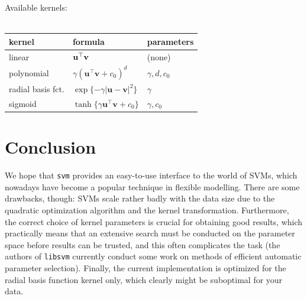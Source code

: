 \documentclass[a4paper]{article}
\begin{document}
\noindent Available kernels:\\
\\
\noindent
\begin{table}[h]
  \centering
  \begin{tabular}{|l|l|l|} \hline
    kernel            & formula & parameters \\ \hline \hline
    linear            & $\bf u^\top v$& (none) \\
    polynomial        & $\gamma (\mathbf{u^\top v}+c_0)^d$ & $\gamma, d, c_0$\\
    radial basis fct. & $\exp\{-\gamma|\mathbf{u-v}|^2\}$&$\gamma$\\
    sigmoid           & $\tanh\{\gamma \mathbf{u^\top v}+c_0\}$ &$\gamma, c_0$\\ \hline
  \end{tabular}
\end{table}

\section*{Conclusion}

We hope that \texttt{svm} provides an easy-to-use interface to the
world of SVMs, which nowadays have become a popular technique in
flexible modelling. There are some drawbacks, though:
SVMs scale rather badly with the data size due to the quadratic
optimization algorithm and the kernel transformation. Furthermore,
the correct choice of kernel parameters is crucial for obtaining good
results, which practically means that an extensive 
search must be conducted on the parameter space before results can be
trusted, and this often complicates the task
(the authors of \texttt{libsvm} currently conduct some work on methods of efficient automatic
parameter selection). Finally, the current implementation is optimized
for the radial basis function kernel only, which clearly might be
suboptimal for your data.
\end{document}
